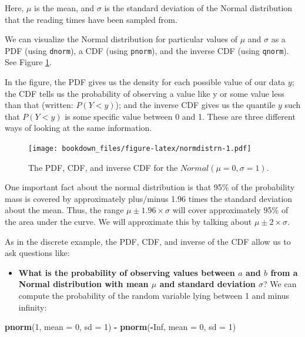 \documentclass[12pt,]{krantz}
\newenvironment{Shaded}{\begin{snugshade}}{\end{snugshade}}
\newcommand{\DataTypeTok}[1]{\textcolor[rgb]{0.13,0.29,0.53}{#1}}
\newcommand{\DecValTok}[1]{\textcolor[rgb]{0.00,0.00,0.81}{#1}}
\newcommand{\KeywordTok}[1]{\textcolor[rgb]{0.13,0.29,0.53}{\textbf{#1}}}
\newcommand{\NormalTok}[1]{#1}
\newcommand{\OperatorTok}[1]{\textcolor[rgb]{0.81,0.36,0.00}{\textbf{#1}}}
\newcommand{\OtherTok}[1]{\textcolor[rgb]{0.56,0.35,0.01}{#1}}
\newcommand{\StringTok}[1]{\textcolor[rgb]{0.31,0.60,0.02}{#1}}
\providecommand{\tightlist}{%
  \setlength{\itemsep}{0pt}\setlength{\parskip}{0pt}}
\begin{document}
Here, \(\mu\) is the mean, and \(\sigma\) is the standard deviation of the Normal distribution that the reading times have been sampled from.

We can visualize the Normal distribution for particular values of \(\mu\) and \(\sigma\) as a PDF (using \texttt{dnorm}), a CDF (using \texttt{pnorm}), and the inverse CDF (using \texttt{qnorm}). See Figure \ref{fig:normdistrn}.

In the figure, the PDF gives us the density for each possible value of our data \(y\); the CDF tells us the probability of observing a value like y or some value less than that (written: \(P(Y<y)\)); and the inverse CDF gives us the quantile \(y\) such that \(P(Y<y)\) is some specific value between 0 and 1. These are three different ways of looking at the same information.

\begin{figure}
\centering
\texttt{[image: bookdown\_files/figure-latex/normdistrn-1.pdf]}
\caption{\label{fig:normdistrn}The PDF, CDF, and inverse CDF for the \(Normal(\mu=0,\sigma=1)\).}
\end{figure}

One important fact about the normal distribution is that 95\% of the probability mass is covered by approximately plus/minus 1.96 times the standard deviation about the mean. Thus, the range \(\mu\pm 1.96\times \sigma\) will cover approximately 95\% of the area under the curve. We will approximate this by talking about \(\mu\pm 2\times \sigma\).

As in the discrete example, the PDF, CDF, and inverse of the CDF allow us to ask questions like:

\begin{itemize}
\tightlist
\item
  \textbf{What is the probability of observing values between \(a\) and \(b\) from a Normal distribution with mean \(\mu\) and standard deviation \(\sigma\)}? We can compute the probability of the random variable lying between 1 and minus infinity:
\end{itemize}

\begin{Shaded}
\begin{Highlighting}[]
\KeywordTok{pnorm}\NormalTok{(}\DecValTok{1}\NormalTok{, }\DataTypeTok{mean =} \DecValTok{0}\NormalTok{, }\DataTypeTok{sd =} \DecValTok{1}\NormalTok{) }\OperatorTok{-}\StringTok{ }\KeywordTok{pnorm}\NormalTok{(}\OperatorTok{-}\OtherTok{Inf}\NormalTok{, }
  \DataTypeTok{mean =} \DecValTok{0}\NormalTok{, }\DataTypeTok{sd =} \DecValTok{1}\NormalTok{)}
\end{Highlighting}
\end{Shaded}
\end{document}
